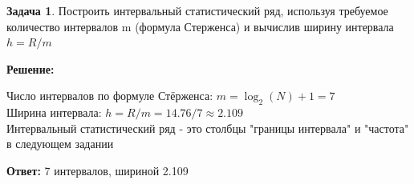 \documentclass[a4paper,11pt]{article}
\theoremstyle{definition}
\newtheorem{problem}{Задача}\setlength{\parindent}{0pt}
\newenvironment{solution}
{\begin{shaded}\textbf{Решение:}\par\setlength{\parindent}{0pt}}
{\end{shaded}}
\newenvironment{answer}
{\par\noindent\textbf{Ответ:} }
{\par}
\begin{document}
\vspace{8pt}
\begin{problem}
    Построить интервальный статистический ряд, используя требуемое количество
    интервалов m (формула Стерженса) и вычислив ширину интервала \(h = R/m\)
    
        \begin{solution}
            Число интервалов по формуле Стёрженса: \( m = \log_2 (N) + 1 =7\) \\
            Ширина интервала: \( h = R/m = 14.76/7 \approx 2.109\) \\
            Интервальный статистический ряд - это столбцы "границы интервала" 
            и "частота" в следующем задании
        \end{solution}
    
        \begin{answer}
            7 интервалов, шириной 2.109
        \end{answer}
    
    \end{problem}
\end{document}
